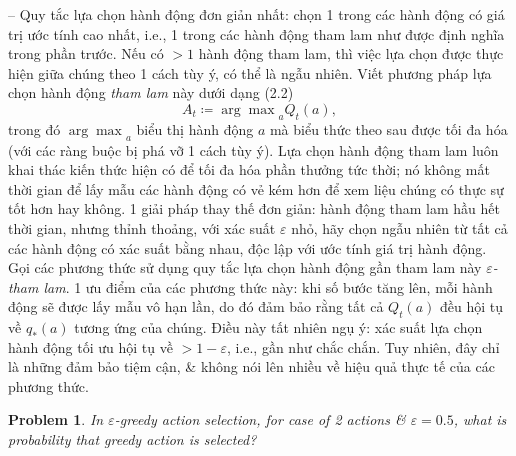 \documentclass{article}
\newtheorem{problem}{Problem}
\begin{document}
\begin{itemize}
\begin{itemize}
        -- Quy tắc lựa chọn hành động đơn giản nhất: chọn 1 trong các hành động có giá trị ước tính cao nhất, i.e., 1 trong các hành động tham lam như được định nghĩa trong phần trước. Nếu có $> 1$ hành động tham lam, thì việc lựa chọn được thực hiện giữa chúng theo 1 cách tùy ý, có thể là ngẫu nhiên. Viết phương pháp lựa chọn hành động {\it tham lam} này dưới dạng (2.2)
        \begin{equation*}
            A_t\coloneqq{\arg\max}_a Q_t(a),
        \end{equation*}
        trong đó ${\arg\max}_a$ biểu thị hành động $a$ mà biểu thức theo sau được tối đa hóa (với các ràng buộc bị phá vỡ 1 cách tùy ý). Lựa chọn hành động tham lam luôn khai thác kiến thức hiện có để tối đa hóa phần thưởng tức thời; nó không mất thời gian để lấy mẫu các hành động có vẻ kém hơn để xem liệu chúng có thực sự tốt hơn hay không. 1 giải pháp thay thế đơn giản: hành động tham lam hầu hết thời gian, nhưng thỉnh thoảng, với xác suất $\varepsilon$ nhỏ, hãy chọn ngẫu nhiên từ tất cả các hành động có xác suất bằng nhau, độc lập với ước tính giá trị hành động. Gọi các phương thức sử dụng quy tắc lựa chọn hành động gần tham lam này {\it$\varepsilon$-tham lam}. 1 ưu điểm của các phương thức này: khi số bước tăng lên, mỗi hành động sẽ được lấy mẫu vô hạn lần, do đó đảm bảo rằng tất cả $Q_t(a)$ đều hội tụ về $q_*(a)$ tương ứng của chúng. Điều này tất nhiên ngụ ý: xác suất lựa chọn hành động tối ưu hội tụ về $> 1 - \varepsilon$, i.e., gần như chắc chắn. Tuy nhiên, đây chỉ là những đảm bảo tiệm cận, \& không nói lên nhiều về hiệu quả thực tế của các phương thức.

        \begin{problem}
            In $\varepsilon$-greedy action selection, for case of 2 actions \& $\varepsilon = 0.5$, what is probability that greedy action is selected?


\end{problem}
\end{itemize}
\end{itemize}
\end{document}
